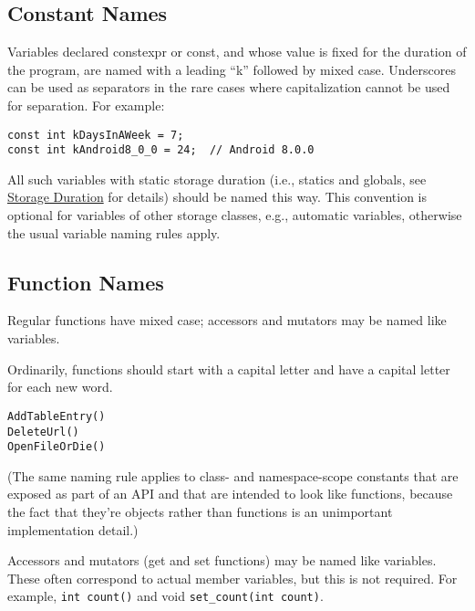     \subsection{Constant Names}\label{subsec:constant-names}
    Variables declared constexpr or const, and whose value is fixed for the duration of the program, are named with a leading \enquote{k} followed by mixed case. Underscores can be used as separators in the rare cases where capitalization cannot be used for separation. For example:
\begin{verbatim}
const int kDaysInAWeek = 7;
const int kAndroid8_0_0 = 24;  // Android 8.0.0
    \end{verbatim}
    All such variables with static storage duration (i.e., statics and globals, see \href{http://en.cppreference.com/w/cpp/language/storage_duration#Storage_duration}{Storage Duration} for details) should be named this way. This convention is optional for variables of other storage classes, e.g., automatic variables, otherwise the usual variable naming rules apply.
    \subsection{Function Names}
    Regular functions have mixed case; accessors and mutators may be named like variables.

    Ordinarily, functions should start with a capital letter and have a capital letter for each new word.
\begin{verbatim}
AddTableEntry()
DeleteUrl()
OpenFileOrDie()
    \end{verbatim}
    (The same naming rule applies to class- and namespace-scope constants that are exposed as part of an API and that are intended to look like functions, because the fact that they're objects rather than functions is an unimportant implementation detail.)

    Accessors and mutators (get and set functions) may be named like variables. These often correspond to actual member variables, but this is not required. For example, \texttt{int count()} and void \texttt{set_count(int count)}.
